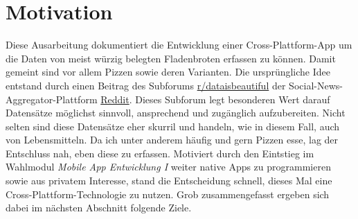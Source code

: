 \section{Motivation}

Diese Ausarbeitung dokumentiert die Entwicklung einer Cross-Plattform-App
um die Daten von meist würzig belegten Fladenbroten erfassen zu können.
Damit gemeint sind vor allem Pizzen sowie deren Varianten.
Die ursprüngliche Idee entstand durch einen Beitrag des Subforums
\href{https://de.reddit.com/r/dataisbeautiful/}{r/dataisbeautiful}
der Social-News-Aggregator-Plattform \href{https://de.reddit.com/}{Reddit}.
Dieses Subforum legt besonderen Wert darauf Datensätze möglichst sinnvoll,
ansprechend und zugänglich aufzubereiten. Nicht selten sind diese
Datensätze eher skurril und handeln, wie in diesem Fall, auch von Lebensmitteln.
Da ich unter anderem häufig und gern Pizzen esse, lag der Entschluss nah,
eben diese zu erfassen.
Motiviert durch den Eintstieg im Wahlmodul \textit{Mobile App Entwicklung I}
weiter native Apps zu programmieren sowie aus privatem Interesse,
stand die Entscheidung schnell, dieses Mal eine Cross-Plattform-Technologie zu nutzen.
Grob zusammengefasst ergeben sich dabei im nächsten Abschnitt folgende Ziele.
